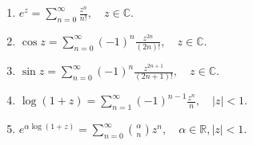 \documentclass[../../main.tex]{subfiles}
\begin{document}
\begin{proposition}[常用的初等函数的Taylor展开式]\label{proposition:常用的初等函数的Taylor展开式}
\begin{enumerate}[(1)]
\item $e^z = \sum_{n=0}^{\infty} \frac{z^n}{n!}, \quad z \in \mathbb{C}.$

\item $\cos z = \sum_{n=0}^{\infty} (-1)^n \frac{z^{2n}}{(2n)!},\quad z \in \mathbb{C}.$

\item $\sin z = \sum_{n=0}^{\infty} (-1)^n \frac{z^{2n + 1}}{(2n + 1)!},\quad z \in \mathbb{C}.$

\item $\log(1 + z) = \sum_{n=1}^{\infty} (-1)^{n - 1} \frac{z^n}{n}, \quad |z| < 1.$

\item $e^{\alpha \log(1 + z)} = \sum_{n=0}^{\infty} \binom{\alpha}{n} z^n, \quad \alpha \in \mathbb{R},|z| < 1.$
\end{enumerate}
\end{proposition}
\end{document}

